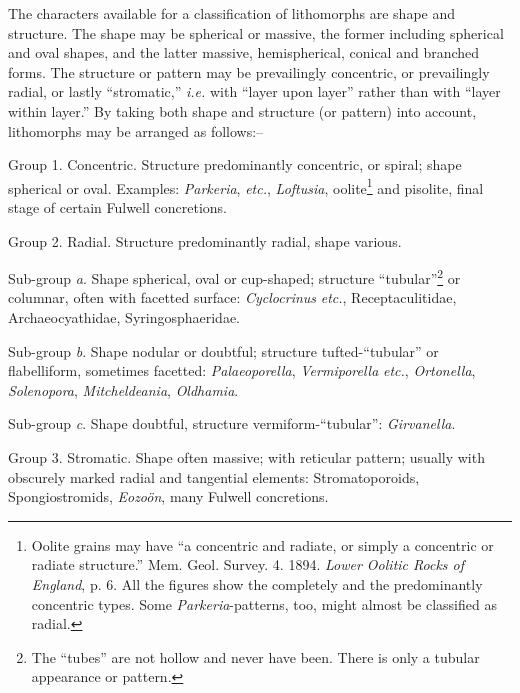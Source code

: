 \documentclass[a4paper, 12pt, oneside]{article}
\begin{document}
The characters available for a classification of lithomorphs are shape and structure. The shape may be spherical or massive, the former including spherical and oval shapes, and the latter massive, hemispherical, conical and branched forms. The structure or pattern may be prevailingly concentric, or prevailingly radial, or lastly ``stromatic,'' \emph{i.e.} with ``layer upon layer'' rather than with ``layer within layer.'' By taking both shape and structure (or pattern) into account, lithomorphs may be arranged as follows:--
\begin{description}
    \item Group 1. Concentric. Structure predominantly concentric, or spiral; shape spherical or oval. Examples: \emph{Parkeria}, \emph{etc.}, \emph{Loftusia}, oolite\footnote{Oolite grains may have ``a concentric and radiate, or simply a concentric or radiate structure.'' Mem. Geol. Survey. 4. 1894. \emph{Lower Oolitic Rocks of England}, p. 6. All the figures show the completely and the predominantly concentric types. Some \emph{Parkeria}-patterns, too, might almost be classified as radial.} and pisolite, final stage of certain Fulwell concretions.

    \item Group 2. Radial. Structure predominantly radial, shape various.

Sub-group \emph{a}. Shape spherical, oval or cup-shaped; structure ``tubular''\footnote{The ``tubes'' are not hollow and never have been. There is only a tubular appearance or pattern.} or columnar, often with facetted surface: \emph{Cyclocrinus} \emph{etc.}, Receptaculitidae, Archaeocyathidae, Syringosphaeridae.

Sub-group \emph{b}. Shape nodular or doubtful; structure tufted-``tubular'' or flabelliform, sometimes facetted: \emph{Palaeoporella}, \emph{Vermiporella} \emph{etc.}, \emph{Ortonella}, \emph{Solenopora}, \emph{Mitcheldeania}, \emph{Oldhamia}.

Sub-group \emph{c}. Shape doubtful, structure vermiform-``tubular'': \emph{Girvanella}.

    \item Group 3. Stromatic. Shape often massive; with reticular pattern; usually with obscurely marked radial and tangential elements: Stromatoporoids, Spongiostromids, \emph{Eozoön}, many Fulwell concretions.
\end{description}
\end{document}
